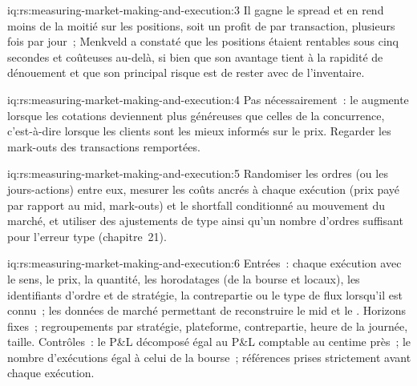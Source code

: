 \begin{solution}{iq:rs:measuring-market-making-and-execution:3}
Il gagne le spread et en rend moins de la moitié sur les positions, soit un profit de  par transaction, plusieurs fois par jour~; Menkveld a constaté que les
positions étaient rentables sous cinq secondes et coûteuses au-delà, si bien que son avantage tient à la rapidité de dénouement et que son principal risque est de rester avec de l'inventaire.
\end{solution}

\begin{solution}{iq:rs:measuring-market-making-and-execution:4}
Pas nécessairement~: le  augmente lorsque les cotations deviennent plus généreuses que celles de la concurrence, c'est-à-dire lorsque les clients sont les
mieux informés sur le prix. Regarder les mark-outs des transactions remportées.
\end{solution}

\begin{solution}{iq:rs:measuring-market-making-and-execution:5}
Randomiser les ordres (ou les jours-actions) entre eux, mesurer les coûts ancrés à chaque exécution (prix payé par rapport au mid, mark-outs) et le shortfall conditionné au
mouvement du marché, et utiliser des ajustements de type  ainsi qu'un nombre d'ordres suffisant pour l'erreur type (chapitre~21).
\end{solution}

\begin{solution}{iq:rs:measuring-market-making-and-execution:6}
Entrées~: chaque exécution avec le sens, le prix, la quantité, les horodatages (de la bourse et locaux), les identifiants d'ordre et de stratégie, la contrepartie ou le type de flux lorsqu'il est connu~; les données de marché permettant
de reconstruire le mid et le . Horizons fixes~; regroupements par stratégie, plateforme, contrepartie, heure de la journée, taille. Contrôles~: le P\&L décomposé égal au P\&L comptable
au centime près~; le nombre d'exécutions égal à celui de la bourse~; références prises strictement avant chaque exécution.
\end{solution}

